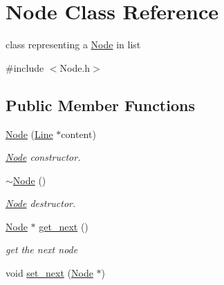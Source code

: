 \hypertarget{classNode}{\section{\-Node \-Class \-Reference}
\label{classNode}
}


class representing a \hyperlink{classNode}{\-Node} in list  




{\ttfamily \#include $<$\-Node.\-h$>$}

\subsection*{\-Public \-Member \-Functions}
\begin{DoxyCompactItemize}
\item 
\hypertarget{classNode_a38b4c6850bd8b7f57986ab2131b09918}{\hyperlink{classNode_a38b4c6850bd8b7f57986ab2131b09918}{\-Node} (\hyperlink{classLine}{\-Line} $\ast$content)}\label{classNode_a38b4c6850bd8b7f57986ab2131b09918}

\begin{DoxyCompactList}\small\item\em \hyperlink{classNode}{\-Node} constructor. \end{DoxyCompactList}\item 
\hypertarget{classNode_aa0840c3cb5c7159be6d992adecd2097c}{\hyperlink{classNode_aa0840c3cb5c7159be6d992adecd2097c}{$\sim$\-Node} ()}\label{classNode_aa0840c3cb5c7159be6d992adecd2097c}

\begin{DoxyCompactList}\small\item\em \hyperlink{classNode}{\-Node} destructor. \end{DoxyCompactList}\item 
\hypertarget{classNode_a815c897407e2c039c4d86ef42848d8e5}{\hyperlink{classNode}{\-Node} $\ast$ \hyperlink{classNode_a815c897407e2c039c4d86ef42848d8e5}{get\-\_\-next} ()}\label{classNode_a815c897407e2c039c4d86ef42848d8e5}

\begin{DoxyCompactList}\small\item\em get the next node \end{DoxyCompactList}\item 
\hypertarget{classNode_afdf4d8e60306222a592c1403410c176f}{void \hyperlink{classNode_afdf4d8e60306222a592c1403410c176f}{set\-\_\-next} (\hyperlink{classNode}{\-Node} $\ast$)}\label{classNode_afdf4d8e60306222a592c1403410c176f}


\end{DoxyCompactItemize}
